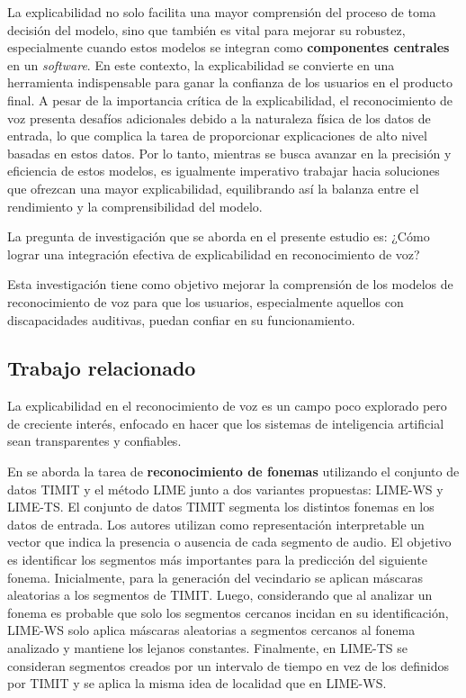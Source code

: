 \documentclass[conference]{IEEEtran}
\begin{document}
La explicabilidad no solo facilita una mayor comprensión del proceso de toma decisión del modelo, sino que también es vital para mejorar su robustez, especialmente cuando estos modelos se integran como \textbf{componentes centrales} en un \textit{software}. En este contexto, la explicabilidad se convierte en una herramienta indispensable para ganar la confianza de los usuarios en el producto final. A pesar de la importancia crítica de la explicabilidad, el reconocimiento de voz presenta desafíos adicionales debido a la naturaleza física de los datos de entrada, lo que complica la tarea de proporcionar explicaciones de alto nivel basadas en estos datos. Por lo tanto, mientras se busca avanzar en la precisión y eficiencia de estos modelos, es igualmente imperativo trabajar hacia soluciones que ofrezcan una mayor explicabilidad, equilibrando así la balanza entre el rendimiento y la comprensibilidad del modelo. 

La pregunta de investigación que se aborda en el presente estudio es: ¿Cómo lograr una integración efectiva de explicabilidad en reconocimiento de voz?

Esta investigación tiene como objetivo mejorar la comprensión de los modelos de reconocimiento de voz para que los usuarios, especialmente aquellos con discapacidades auditivas, puedan confiar en su funcionamiento.

\subsection{Trabajo relacionado}

La explicabilidad en el reconocimiento de voz es un campo poco explorado pero de creciente interés, enfocado en hacer que los sistemas de inteligencia artificial sean transparentes y confiables.

En \cite{wu2023trust} se aborda la tarea de \textbf{reconocimiento de fonemas} utilizando el conjunto de datos TIMIT \cite{timit} y el método LIME junto a dos variantes propuestas: LIME-WS y LIME-TS. El conjunto de datos TIMIT segmenta los distintos fonemas en los datos de entrada. Los autores utilizan como representación interpretable un vector que indica la presencia o ausencia de cada segmento de audio. El objetivo es identificar los segmentos más importantes para la predicción del siguiente fonema. Inicialmente, para la generación del vecindario se aplican máscaras aleatorias a los segmentos de TIMIT. Luego, considerando que al analizar un fonema es probable que solo los segmentos cercanos incidan en su identificación, LIME-WS solo aplica máscaras aleatorias a segmentos cercanos al fonema analizado y mantiene los lejanos constantes. Finalmente, en LIME-TS se consideran segmentos creados por un intervalo de tiempo en vez de los definidos por TIMIT y se aplica la misma idea de localidad que en LIME-WS.
\end{document}
